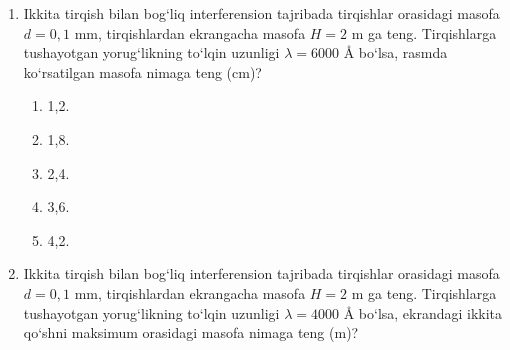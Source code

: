 \begin{enumerate}
\begin{enumerate}[label=\Alph*)]
\item 6-maksimum.
\item 8-minimum.
\item 5-maksimum.
\item 7-maksimum.
\item 4-minimum.
\end{enumerate}

\item Ikkita tirqish bilan bog‘liq interferension tajribada tirqishlar orasidagi masofa $d=0{,}1$ mm, tirqishlardan ekrangacha masofa $H=2$ m ga teng. Tirqishlarga tushayotgan yorug‘likning to‘lqin uzunligi $\lambda=6000$ \AA{} bo‘lsa, rasmda ko‘rsatilgan masofa nimaga teng (cm)?


\begin{enumerate}[label=\Alph*)]
\item 1,2.
\item 1,8.
\item 2,4.
\item 3,6.
\item 4,2.
\end{enumerate}

\item Ikkita tirqish bilan bog‘liq interferension tajribada tirqishlar orasidagi masofa $d=0{,}1$ mm, tirqishlardan ekrangacha masofa $H=2$ m ga teng. Tirqishlarga tushayotgan yorug‘likning to‘lqin uzunligi $\lambda=4000$ \AA{} bo‘lsa, ekrandagi ikkita qo‘shni maksimum orasidagi masofa nimaga teng (m)?


\end{enumerate}
